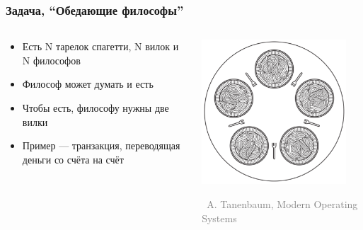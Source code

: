 \documentclass[xetex,mathserif,serif]{beamer}
\newcommand{\attribution}[1] {
\vspace{-2mm}\begin{flushright}\begin{scriptsize}\textcolor{gray}{\textcopyright\, #1}\end{scriptsize}\end{flushright}
}
\begin{document}
    \begin{frame}
        \frametitle{Задача, ``Обедающие философы''}
        \begin{columns}
            \begin{column}{0.5\textwidth}
                \begin{itemize}
                    \item Есть N тарелок спагетти, N вилок и N философов
                    \item Философ может думать и есть
                    \item Чтобы есть, философу нужны две вилки
                    \item Пример --- транзакция, переводящая деньги со счёта на счёт
                \end{itemize}
            \end{column}
            \begin{column}{0.5\textwidth}
                \includegraphics[width=0.9\textwidth]{diningPhilosophers.png}
                \attribution{A. Tanenbaum, Modern Operating Systems}
            \end{column}
        \end{columns}
    \end{frame}
\end{document}
